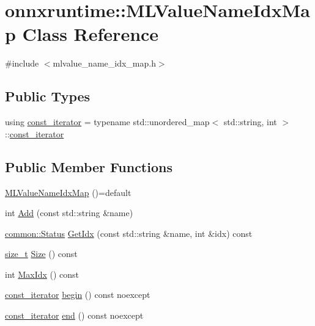 \hypertarget{classonnxruntime_1_1MLValueNameIdxMap}{}\section{onnxruntime\+:\+:M\+L\+Value\+Name\+Idx\+Map Class Reference}
\label{classonnxruntime_1_1MLValueNameIdxMap}


{\ttfamily \#include $<$mlvalue\+\_\+name\+\_\+idx\+\_\+map.\+h$>$}

\subsection*{Public Types}
\begin{DoxyCompactItemize}
\item 
using \mbox{\hyperlink{classonnxruntime_1_1MLValueNameIdxMap_a1958c1e7ae1abe65e658008c626f99cf}{const\+\_\+iterator}} = typename std\+::unordered\+\_\+map$<$ std\+::string, int $>$\+::\mbox{\hyperlink{classonnxruntime_1_1MLValueNameIdxMap_a1958c1e7ae1abe65e658008c626f99cf}{const\+\_\+iterator}}
\end{DoxyCompactItemize}
\subsection*{Public Member Functions}
\begin{DoxyCompactItemize}
\item 
\mbox{\hyperlink{classonnxruntime_1_1MLValueNameIdxMap_ad8f0d5fc4bf905b7d529e77edcbbbaad}{M\+L\+Value\+Name\+Idx\+Map}} ()=default
\item 
int \mbox{\hyperlink{classonnxruntime_1_1MLValueNameIdxMap_ae4e71c6686ccce9d8a518924fb3d2dfb}{Add}} (const std\+::string \&name)
\item 
\mbox{\hyperlink{classonnxruntime_1_1common_1_1Status}{common\+::\+Status}} \mbox{\hyperlink{classonnxruntime_1_1MLValueNameIdxMap_a9f6ce23655823acce1d71a987c5e5e9a}{Get\+Idx}} (const std\+::string \&name, int \&idx) const
\item 
\mbox{\hyperlink{mlasi_8h_a503efbc1c6e50825320ad909366b78ab}{size\+\_\+t}} \mbox{\hyperlink{classonnxruntime_1_1MLValueNameIdxMap_a328bff93d67f36db0019362bcccff58f}{Size}} () const
\item 
int \mbox{\hyperlink{classonnxruntime_1_1MLValueNameIdxMap_a8789325a741d5cc81f0fee4604cac188}{Max\+Idx}} () const
\item 
\mbox{\hyperlink{classonnxruntime_1_1MLValueNameIdxMap_a1958c1e7ae1abe65e658008c626f99cf}{const\+\_\+iterator}} \mbox{\hyperlink{classonnxruntime_1_1MLValueNameIdxMap_a2531ac97532354ad6510cc32c5e59afd}{begin}} () const noexcept
\item 
\mbox{\hyperlink{classonnxruntime_1_1MLValueNameIdxMap_a1958c1e7ae1abe65e658008c626f99cf}{const\+\_\+iterator}} \mbox{\hyperlink{classonnxruntime_1_1MLValueNameIdxMap_a9dbab9c6f1658713605bebbbda532cff}{end}} () const noexcept
\end{DoxyCompactItemize}


